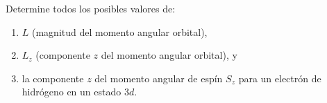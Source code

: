 \item Determine todos los posibles valores de:
\begin{enumerate}
    \item $L$ (magnitud del momento angular orbital),
    \item $L_z$ (componente $z$ del momento angular orbital), y
    \item la componente $z$ del momento angular de espín $S_z$ para un electrón de hidrógeno en un estado $3d$.
\end{enumerate}
